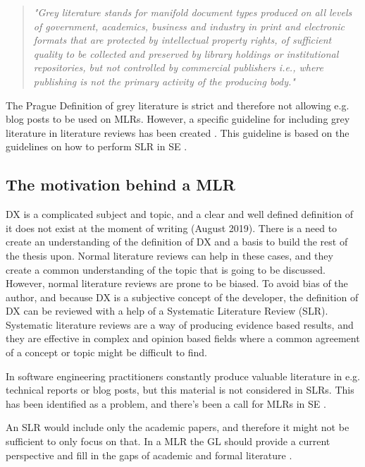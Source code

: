\documentclass[english, 12pt, a4paper, sci, utf8, a-1b, online]{aaltothesis}
\begin{document}
\begin{quotation}
  \textit{"Grey literature stands for manifold document types produced on all levels of government, academics, business and industry in print and electronic formats that are protected by intellectual property rights, of sufficient quality to be collected and preserved by library holdings or institutional repositories, but not controlled by commercial publishers i.e., where publishing is not the primary activity of the producing body."} \citep{towards-a-prague-definition-of-grey-literature}
\end{quotation}

The Prague Definition of grey literature is strict and therefore not allowing e.g. blog posts to be used on MLRs. However, a specific guideline for including grey literature in literature reviews has been created \citep{guidelines-for-MLR}. This guideline is based on the guidelines on how to perform SLR in SE \citep{guidelines-for-SLR-in-SE}.


\subsection{The motivation behind a MLR}

DX is a complicated subject and topic, and a clear and well defined definition of it does not exist at the moment of writing (August 2019). There is a need to create an understanding of the definition of DX and a basis to build the rest of the thesis upon. Normal literature reviews can help in these cases, and they create a common understanding of the topic that is going to be discussed. However, normal literature reviews are prone to be biased. To avoid bias of the author, and because DX is a subjective concept of the developer, the definition of DX can be reviewed with a help of a Systematic Literature Review (SLR). Systematic literature reviews are a way of producing evidence based results, and they are effective in complex and opinion based fields where a common agreement of a concept or topic might be difficult to find.

In software engineering practitioners constantly produce valuable literature in e.g. technical reports or blog posts, but this material is not considered in SLRs. This has been identified as a problem, and there's been a call for MLRs in SE \citep{the-need-for-MLR}.

An SLR would include only the academic papers, and therefore it might not be sufficient to only focus on that. In a MLR the GL should provide a current perspective and fill in the gaps of academic and formal literature \citep{guidelines-for-MLR}.
\end{document}
